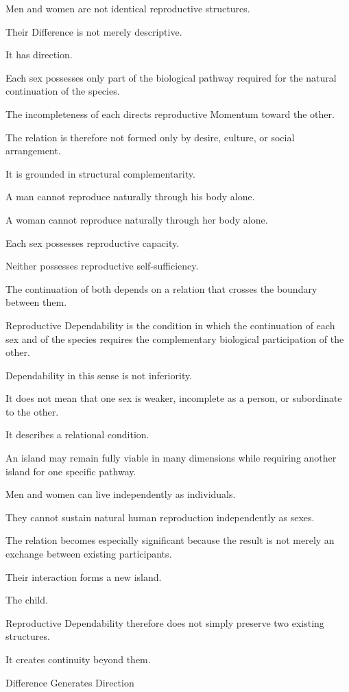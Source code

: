 Men and women are not identical reproductive structures.

Their Difference is not merely descriptive.

It has direction.

Each sex possesses only part of the biological pathway required for the natural continuation of the species.

The incompleteness of each directs reproductive Momentum toward the other.

The relation is therefore not formed only by desire, culture, or social arrangement.

It is grounded in structural complementarity.

A man cannot reproduce naturally through his body alone.

A woman cannot reproduce naturally through her body alone.

Each sex possesses reproductive capacity.

Neither possesses reproductive self-sufficiency.

The continuation of both depends on a relation that crosses the boundary between them.

Reproductive Dependability is the condition in which the continuation of each sex and of the species requires the complementary biological participation of the other.

Dependability in this sense is not inferiority.

It does not mean that one sex is weaker, incomplete as a person, or subordinate to the other.

It describes a relational condition.

An island may remain fully viable in many dimensions while requiring another island for one specific pathway.

Men and women can live independently as individuals.

They cannot sustain natural human reproduction independently as sexes.

The relation becomes especially significant because the result is not merely an exchange between existing participants.

Their interaction forms a new island.

The child.

Reproductive Dependability therefore does not simply preserve two existing structures.

It creates continuity beyond them.

Difference Generates Direction

